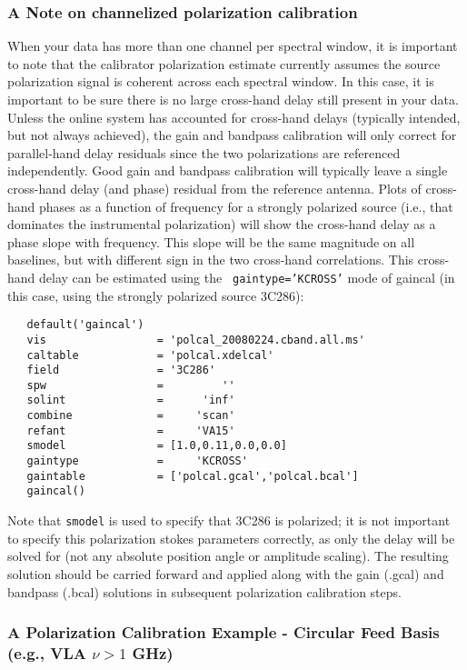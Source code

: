 \subsubsection{A Note on channelized polarization calibration}

When your data has more than one channel per spectral window, it is
important to note that the calibrator polarization estimate currently
assumes the source polarization signal is coherent across each
spectral window.  In this case, it is important to be sure there is no
large cross-hand delay still present in your data.  Unless the online
system has accounted for cross-hand delays (typically intended, but
not always achieved), the gain and bandpass calibration will only
correct for parallel-hand delay residuals since the two polarizations
are referenced independently.  Good gain and bandpass calibration will
typically leave a single cross-hand delay (and phase) residual from
the reference antenna.  Plots of cross-hand phases as a function of
frequency for a strongly polarized source (i.e., that dominates the
instrumental polarization) will show the cross-hand delay as a phase
slope with frequency.  This slope will be the same magnitude on all
baselines, but with different sign in the two cross-hand correlations.
This cross-hand delay can be estimated using the {\tt
gaintype='KCROSS'} mode of gaincal (in this case, using the strongly
polarized source 3C286):

\small
\begin{verbatim}
   default('gaincal')
   vis                 = 'polcal_20080224.cband.all.ms'
   caltable            = 'polcal.xdelcal'
   field               = '3C286'        
   spw                 =         ''        
   solint              =      'inf'    
   combine             =     'scan' 
   refant              =     'VA15'
   smodel              = [1.0,0.11,0.0,0.0]        
   gaintype            =     'KCROSS'        
   gaintable           = ['polcal.gcal','polcal.bcal']
   gaincal()
\end{verbatim}
\normalsize

Note that {\tt smodel} is used to specify that 3C286 is polarized; it is not
important to specify this polarization stokes parameters correctly, as only 
the delay will be solved for (not any absolute position angle or amplitude 
scaling).  The resulting solution should be carried forward and applied 
along with the gain (.gcal) and
bandpass (.bcal) solutions in subsequent polarization calibration steps.


\subsubsection{A Polarization Calibration Example - Circular Feed
  Basis (e.g., VLA $\nu>1$ GHz)}
\label{section:cal.solve.pol.example}

